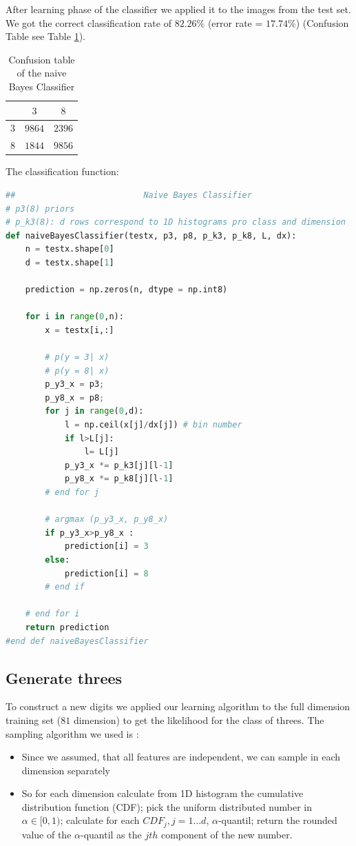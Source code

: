 \documentclass{article}
\begin{document}
\FloatBarrier

After learning phase of the classifier we applied it to the images from the test set. We got the correct classification rate of $82.26\%$ (error rate = $17.74\%$) (Confusion Table see Table \ref{Table1}).

\begin{table}[hbt]
	\centering
	\begin{tabular}{|l|c|c|}
		\hline
		 & $3$ & $8$ \\ \hline
		$3$ & $9864$ & $2396$  \\ 
		$8$ & $1844$ & $9856$ \\ \hline 
	\end{tabular}
\caption{Confusion table of the naive Bayes Classifier}
\label{Table1}
\end{table}
\FloatBarrier

The classification function: 
\begin{lstlisting}[language=Python]
##                          Naive Bayes Classifier
# p3(8) priors
# p_k3(8): d rows correspond to 1D histograms pro class and dimension
def naiveBayesClassifier(testx, p3, p8, p_k3, p_k8, L, dx):
    n = testx.shape[0]
    d = testx.shape[1]
    
    prediction = np.zeros(n, dtype = np.int8)
        
    for i in range(0,n):
        x = testx[i,:]
        
        # p(y = 3| x)
        # p(y = 8| x)        
        p_y3_x = p3;
        p_y8_x = p8;
        for j in range(0,d):
            l = np.ceil(x[j]/dx[j]) # bin number         
            if l>L[j]:
                l= L[j]             
            p_y3_x *= p_k3[j][l-1]
            p_y8_x *= p_k8[j][l-1]           
        # end for j

        # argmax (p_y3_x, p_y8_x) 
        if p_y3_x>p_y8_x :
            prediction[i] = 3
        else:
            prediction[i] = 8
        # end if        
        
    # end for i
    return prediction
#end def naiveBayesClassifier
\end{lstlisting}

\subsection{Generate threes}
To construct a new digits we applied our learning algorithm to the full dimension training set ($81$ dimension) to get the likelihood for the class of threes. The sampling algorithm we used is : 
	\begin{itemize}
	\item Since we assumed, that all features are independent, we can sample in each dimension separately
	\item So for each dimension calculate from 1D histogram the cumulative distribution function (CDF); pick the uniform distributed number 	in $\alpha\in[0,1)$; calculate for each $CDF_j, j=1\dots d$, $\alpha$-quantil; return the rounded value of the $\alpha$-quantil as the $j{th}$ component of the new number.
	\end{itemize}	
\end{document}
